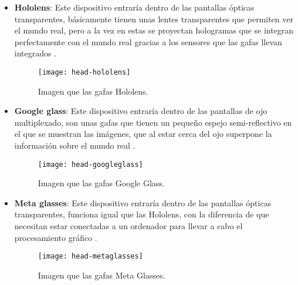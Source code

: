 \begin{itemize}
  \item \textbf{Hololens}: Este dispositivo entraría dentro de las pantallas ópticas transparentes, básicamente tienen unas lentes transparentes que permiten ver el mundo real, pero a la vez en estas se proyectan hologramas que se integran perfectamente con el mundo real gracias a los sensores que las gafas llevan integrados \cite{hololens}.

  \begin{figure}[h]
    \centering
    \texttt{[image: head-hololens]}
    \caption{Imagen que las gafas Hololens.\protect\footnotemark}
    \label{figura-hololens}
  \end{figure}


  \newpage

  \item \textbf{Google glass}: Este dispositivo entraría dentro de las pantallas de ojo multiplexado, son unas gafas que tienen un pequeño espejo semi-reflectivo en el que se muestran las imágenes, que al estar cerca del ojo superpone la información sobre el mundo real \cite{likamwa}.

  \begin{figure}[h]
    \centering
    \texttt{[image: head-googleglass]}
    \caption{Imagen que las gafas Google Glass.\protect\footnotemark}
    \label{figura-googleglass}
  \end{figure}


\newpage

  \item \textbf{Meta glasses}: Este dispositivo entraría dentro de las pantallas ópticas transparentes, funciona igual que las Hololens, con la diferencia de que necesitan estar conectadas a un ordenador para llevar a cabo el procesamiento gráfico \cite{meta-vision}.

  \begin{figure}[h]
    \centering
    \texttt{[image: head-metaglasses]}
    \caption{Imagen que las gafas Meta Glasses.\protect\footnotemark}
    \label{figura-metaglasses}
  \end{figure}


\end{itemize}

